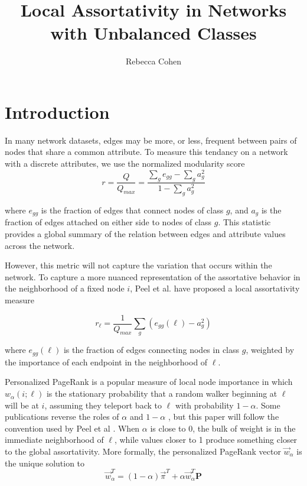 \documentclass[12pt]{article}
\title{Local Assortativity in Networks with Unbalanced Classes}
\author{Rebecca Cohen}
\begin{document}
\maketitle
\section{Introduction}

In many network datasets, edges may be more, or less, frequent between pairs of nodes that share a common attribute.  To measure this tendancy on a network with a discrete attributes, we use the normalized modularity score
 \begin{equation}
   r = \frac{Q}{Q_{max}} = \frac{\sum_g e_{gg} - \sum_g a_g^2} {1 - \sum_g a_g^2}
 \end{equation} \cite{newman:2003}
 
 where $e_{gg}$ is the fraction of edges that connect nodes of class $g$, and $a_g$ is the fraction of edges attached on either side to nodes of class $g$.  This statistic provides a global summary of the relation between edges and attribute values across the network.  
 
However, this metric will not capture the variation that occurs within the network.  To capture a more nuanced representation of the assortative behavior in the neighborhood of a fixed node $i$, Peel et al. have proposed a local assortativity measure

\begin{equation}
  r_\ell = \frac{1}{Q_{max}} \sum_g (e_{gg}(\ell) - a_g^2)
\end{equation}

where $e_{gg}(\ell)$ is the fraction of edges connecting nodes in class $g$, weighted by the importance of each endpoint in the neighborhood of $\ell$.  

Personalized PageRank is a popular measure of local node importance in which $w_\alpha(i; \ell)$ is the stationary probability that a random walker beginning at $\ell$ will be at $i$, assuming they teleport back to $\ell$ with probability $1-\alpha$.  Some publications reverse the roles of $\alpha$ and $1 - \alpha$ \cite{chen:2020}, but this paper will follow the convention used by Peel et al \cite{Peel:2018}.  When $\alpha$ is close to 0, the bulk of weight is in the immediate neighborhood of $\ell$, while values closer to 1 produce something closer to the global assortativity.  More formally, the personalized PageRank vector $\vec{w}_\alpha$ is the unique solution to
\begin{equation}
  \vec{w}_\alpha^T = (1 - \alpha) \vec{\pi}^T + \alpha \vec{w}_\alpha^T \mathbf{P}
\end{equation}
\end{document}
